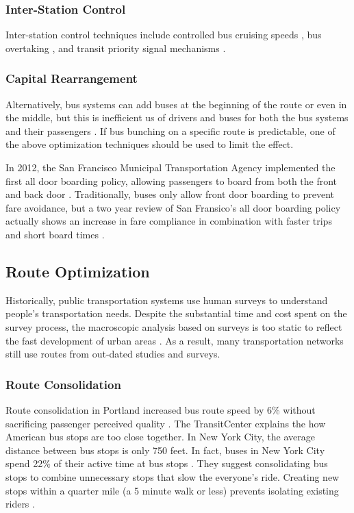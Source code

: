 \documentclass[sigconf]{acmart}
\begin{document}
\subsubsection{Inter-Station Control} Inter-station control techniques include controlled bus cruising speeds \cite{He01}, bus overtaking \cite{Schmocker01}, and transit priority signal mechanisms \cite{Albright01}. 
\subsubsection{Capital Rearrangement} Alternatively, bus systems can add buses at the beginning of the route or even in the middle, but this is inefficient us of drivers and buses for both the bus systems and their passengers \cite{Andres01}. If bus bunching on a specific route is predictable, one of the above optimization techniques should be used to limit the effect.

In 2012, the San Francisco Municipal Transportation Agency  implemented the first all door boarding policy, allowing passengers to board from both the front and back door \cite{SFMTA01}. Traditionally, buses only allow front door boarding to prevent fare avoidance, but a two year review of San Fransico's all door boarding policy actually shows an increase in fare compliance in combination with faster trips and short board times \cite{FTA01}.   

\subsection{Route Optimization}
Historically, public transportation systems use human surveys to understand people's transportation needs. Despite the substantial time and cost spent on the survey process, the macroscopic analysis based on surveys is too static to reflect the fast development of urban areas \cite{Liu01}. As a result, many transportation networks still use routes from out-dated studies and surveys. 

\subsubsection{Route Consolidation} Route consolidation in Portland increased bus route speed by 6\% without sacrificing passenger perceived quality \cite{El01}. The TransitCenter explains the how American bus stops are too close together. In New York City, the average distance between bus stops is only 750 feet. In fact, buses in New York City spend 22\% of their active time at bus stops \cite{TC02}. They suggest consolidating bus stops to combine unnecessary stops that slow the everyone's ride. Creating new stops within a quarter mile (a 5 minute walk or less) prevents isolating existing riders \cite{TC02}.
\end{document}
